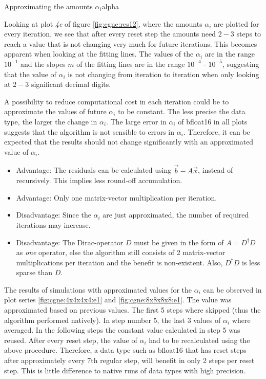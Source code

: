 \documentclass{article}
\theoremstyle{plain} %
\theoremstyle{convention} %
\theoremstyle{remark} %
\numberwithin{equation}{section}
\begin{document}
\begin{proposal}{Approximating the amounts $\alpha_i$}{alpha}

Looking at plot \textit{4e} of figure \ref{fig:cgne:res12}, where the amounts $\alpha_i$ are plotted for every iteration, we see that after every reset step the amounts need $2-3$ steps to reach a value that is not changing very much for future iterations. This becomes apparent when looking at the fitting lines. The values of the $\alpha_i$ are in the range $10^{-1}$ and the slopes $m$ of the fitting lines are in the range $10^{-4}$ - $10^{-5}$, suggesting that the value of $\alpha_i$ is not changing from iteration to iteration when only looking at $2-3$ significant decimal digits.

A possibility to reduce computational cost in each iteration could be to approximate the values of future $\alpha_i$ to be constant. The less precise the data type, the larger the change in $\alpha_i$. The large error in $\alpha_i$ of \gls{bfloat16} in all plots suggests that the algorithm is not sensible to errors in $\alpha_i$. Therefore, it can be expected that the results should not change significantly with an approximated value of $\alpha_i$.

\begin{itemize}
    \item Advantage: The residuals can be calculated using $\vec{b} - A \vec{x}$, instead of recursively. This implies less round-off accumulation.
    \item Advantage: Only one matrix-vector multiplication per iteration.
    \item Disadvantage: Since the $\alpha_i$ are just approximated, the number of required iterations may increase.
    \item Disadvantage: The Dirac-operator $D$ must be given in the form of $A = D^{\dagger} D$ as \textit{one} operator, else the algorithm still consists of \num{2} matrix-vector multiplications per iteration and the benefit is non-existent. Also, $D^{\dagger} D$ is less sparse than $D$.
\end{itemize}

The results of simulations with approximated values for the $\alpha_i$ can be observed in plot series \ref{fig:cgne:4x4x4x4:e1} and \ref{fig:cgne:8x8x8x8:e1}. The value was approximated based on previous values. The first \num{5} steps where skipped (thus the algorithm performed natively). In step number \num{5}, the last \num{3} values of $\alpha_i$ where averaged. In the following steps the constant value calculated in step \num{5} was reused. After every reset step, the value of $\alpha_i$ had to be recalculated using the above procedure. Therefore, a data type such as \gls{bfloat16} that has reset steps after approximately every \num{7}th regular step, will benefit in only \num{2} steps per reset step. This is little difference to native runs of data types with high precision.


\end{proposal}
\end{document}
